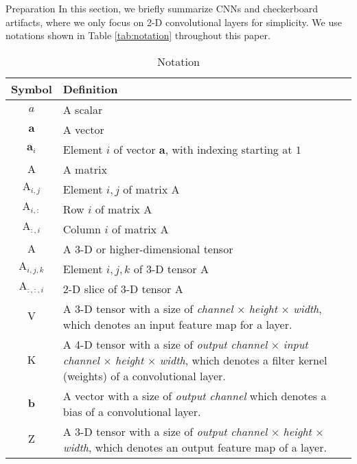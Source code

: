 \documentclass{article}
\makeatletter
\renewcommand\section{\@startsection{section}{1}{\z@}
                      {0.5ex \@plus 0ex \@minus -2ex}
                      {0.5ex \@plus 0ex}
                      {\normalfont\Large\bfseries}}
\newcommand{\myvector}[1]{\boldsymbol{#1}}
\newcommand{\mymatrix}[1]{\mathrm{#1}}
\newcommand{\mytensor}[1]{\boldsymbol{\mathrm{#1}}}
\makeatother
\begin{document}
\section{Preparation}
  In this section, we briefly summarize CNNs and checkerboard artifacts,
  where we only focus on 2-D convolutional layers for simplicity.
  We use notations shown in Table \ref{tab:notation} throughout this paper.
  \begin{table}[!t]
    \centering
    \footnotesize
    \caption{Notation}
    \begin{tabular}{cp{}} \hline\hline
      Symbol & Definition \\ \hline
      $a$ & A scalar \\
      $\myvector{a}$ & A vector \\
      $\myvector{a}_i$ & Element $i$ of vector $\myvector{a}$, with indexing starting at $1$ \\
      $\mymatrix{A}$ & A matrix \\
      $\mymatrix{A}_{i, j}$ & Element $i, j$ of matrix $\mymatrix{A}$ \\
      $\mymatrix{A}_{i, :}$ & Row $i$ of matrix $\mymatrix{A}$ \\
      $\mymatrix{A}_{:, i}$ & Column $i$ of matrix $\mymatrix{A}$ \\
      $\mytensor{A}$ & A 3-D or higher-dimensional tensor \\
      $\mytensor{A}_{i, j, k}$ & Element $i, j, k$ of 3-D tensor $\mytensor{A}$ \\
      $\mytensor{A}_{:, :, i}$ & 2-D slice of 3-D tensor $\mytensor{A}$ \\
      $\mytensor{V}$ & A 3-D tensor with a size of
        \textit{channel} $\times$ \textit{height} $\times$ \textit{width},
        which denotes an input feature map for a layer. \\
      $\mytensor{K}$ & A 4-D tensor with a size of
        \textit{output channel} $\times$ \textit{input channel}
        $\times$ \textit{height} $\times$ \textit{width},
        which denotes a filter kernel (weights) of a convolutional layer. \\
      $\myvector{b}$ & A vector with a size of \textit{output channel}
        which denotes a bias of a convolutional layer. \\
      $\mytensor{Z}$ & A 3-D tensor
        with a size of \textit{output channel} $\times$ \textit{height} $\times$ \textit{width},
        which denotes an output feature map of a layer. \\

\end{tabular}
\end{table}
\end{document}
